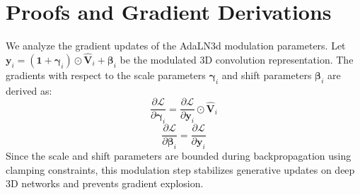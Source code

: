 \appendices
\section{Proofs and Gradient Derivations}
\label{sec:appendix_a}

We analyze the gradient updates of the AdaLN3d modulation parameters. Let $\mathbf{y}_i = (\mathbf{1} + \mathbf{\gamma}_i) \odot \hat{\mathbf{V}}_i + \mathbf{\beta}_i$ be the modulated 3D convolution representation. The gradients with respect to the scale parameters $\mathbf{\gamma}_i$ and shift parameters $\mathbf{\beta}_i$ are derived as:
\begin{equation}
\frac{\partial \mathcal{L}}{\partial \mathbf{\gamma}_i} = \frac{\partial \mathcal{L}}{\partial \mathbf{y}_i} \odot \hat{\mathbf{V}}_i
\label{eq:grad_gamma}
\end{equation}
\begin{equation}
\frac{\partial \mathcal{L}}{\partial \mathbf{\beta}_i} = \frac{\partial \mathcal{L}}{\partial \mathbf{y}_i}
\label{eq:grad_beta}
\end{equation}
Since the scale and shift parameters are bounded during backpropagation using clamping constraints, this modulation step stabilizes generative updates on deep 3D networks and prevents gradient explosion.

